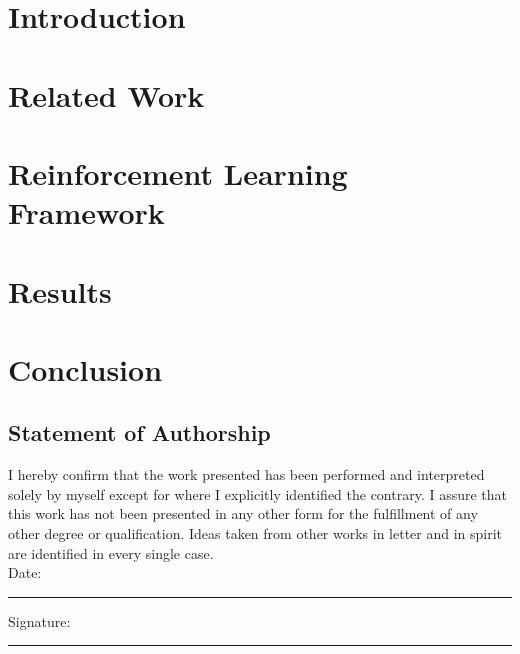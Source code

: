 \documentclass[a4paper,12pt]{report}
\begin{document}
\tableofcontents
\newpage


\chapter{Introduction}
\setcounter{page}{1}

\chapter{Related Work}

\chapter{Reinforcement Learning Framework}

\chapter{Results}

\chapter{Conclusion}


\newpage
\appendix
{}


\newpage
\renewcommand{\bibname}{References}
\renewcommand{\thechapter}{R}


\renewcommand{\thechapter}{\arabic{chapter}} %

\newpage
\section*{Statement of Authorship}

I hereby confirm that the work presented has been performed and interpreted solely by myself except for where I explicitly identified the contrary. I assure that this work has not been presented in any other form for the fulfillment of any other degree or qualification. Ideas taken from other works in letter and in spirit are identified in every single case.\\[2cm]

\noindent Date: \rule{4cm}{0.5pt} \hfill Signature: \rule{6cm}{0.5pt}
\end{document}
